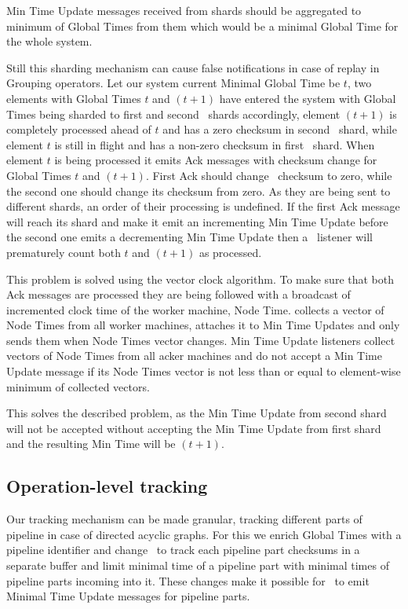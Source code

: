 Min Time Update messages received from shards should be aggregated to minimum of Global Times from them which would be a minimal Global Time for the whole system.

Still this sharding mechanism can cause false notifications in case of replay in Grouping operators. Let our system current Minimal Global Time be $t$, two elements with Global Times $t$ and $(t+1)$ have entered the system with Global Times being sharded to first and second \tracker\ shards accordingly, element $(t+1)$ is completely processed ahead of $t$ and has a zero checksum in second \tracker\ shard, while element $t$ is still in flight and has a non-zero checksum in first \tracker\ shard. When element $t$ is being processed it emits Ack messages with checksum change for Global Times $t$ and $(t+1)$. First Ack should change \tracker\ checksum to zero, while the second one should change its checksum from zero. As they are being sent to different shards, an order of their processing is undefined. If the first Ack message will reach its shard and make it emit an incrementing Min Time Update before the second one emits a decrementing Min Time Update then a \tracker\ listener will prematurely count both $t$ and $(t+1)$ as processed.

This problem is solved using the vector clock algorithm. To make sure that both Ack messages are processed they are being followed with a broadcast of incremented clock time of the worker machine, Node Time. \tracker collects a vector of Node Times from all worker machines, attaches it to Min Time Updates and only sends them when Node Times vector changes. Min Time Update listeners collect vectors of Node Times from all acker machines and do not accept a Min Time Update message if its Node Times vector is not less than or equal to element-wise minimum of collected vectors.

This solves the described problem, as the Min Time Update from second shard will not be accepted without accepting the Min Time Update from first shard and the resulting Min Time will be $(t+1)$.

\subsection{Operation-level tracking}

Our tracking mechanism can be made granular, tracking different parts of pipeline in case of directed acyclic graphs. For this we enrich Global Times with a pipeline identifier and change \tracker\ to track each pipeline part checksums in a separate buffer and limit minimal time of a pipeline part with minimal times of pipeline parts incoming into it. These changes make it possible for \tracker\ to emit Minimal Time Update messages for pipeline parts.
